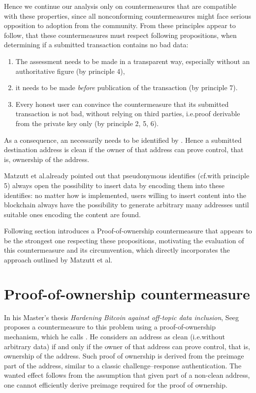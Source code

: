 \documentclass[a4paper,11pt,titlepage]{scrbook}
\begin{document}
Hence we continue our analysis only on countermeasures that are compatible with these properties,
since all nonconforming countermeasures might face serious opposition to adoption from the community.
From these principles appear to follow, that these countermeasures must respect following propositions, when determining if a submitted transaction contains no bad data:
\begin{enumerate}
    \item The assessment needs to be made in a transparent way, especially without an authoritative figure (by principle 4),
    \item it needs to be made \emph{before} publication of the transaction (by principle 7).
    \item Every honest user can convince the countermeasure that its submitted transaction is not bad, without relying on third parties, i.e.\@ proof derivable from the private key only (by principle 2, 5, 6).
\end{enumerate}
As a consequence, an  necessarily needs to be identified by .
Hence a submitted destination address is clean if the owner of that address can prove control, that is, ownership of the address.

Matzutt et al.\@ already pointed out that pseudonymous identifies (cf.\@ with principle 5) always open the possibility to insert data by encoding them into these identifies: no matter how  is implemented, users willing to insert content into the blockchain always have the possibility to generate arbitrary many addresses until suitable ones encoding the content are found.

Following section introduces a Proof-of-ownership countermeasure that appears to be the strongest one respecting these propositions, motivating the evaluation of this countermeasure and its circumvention, which directly incorporates the approach outlined by Matzutt et al.


\section{Proof-of-ownership countermeasure}

In his Master's thesis \emph{Hardening Bitcoin against off-topic data inclusion}, Seeg proposes a countermeasure to this problem using a proof-of-ownership mechanism, which he calls . 
%
He considers an address as clean (i.e.\@ without arbitrary data) if and only if the owner of that address can prove control, that is, ownership of the address.
Such proof of ownership is derived from the  preimage part of the address, similar to a classic challenge–response authentication.
The wanted effect follows from the assumption that given  part of a non-clean address, one cannot efficiently derive  preimage required for the proof of ownership.
\end{document}
